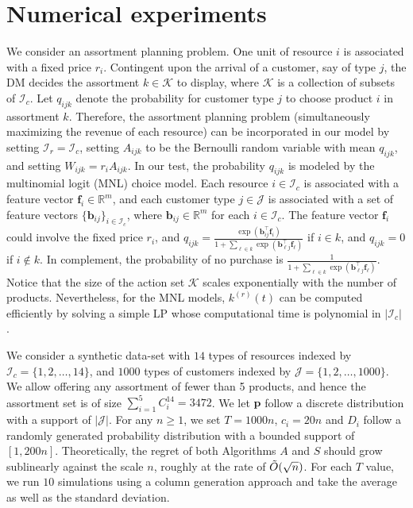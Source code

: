 \documentclass[letterpaper, 10 pt, conference]{ieeeconf}  %
\newcommand{\III}{\mathcal{I}}
\newcommand{\JJJ}{\mathcal{J}}
\newcommand{\KKK}{\mathcal{K}}
\theoremstyle{plain}
\theoremstyle{definition}
\theoremstyle{remark}
\begin{document}
\section{Numerical experiments}\label{sec:num}
We consider an assortment planning problem. One unit of resource $i$ is associated with a fixed price $r_i$. Contingent upon the arrival of a customer, say of type $j$, the DM decides the assortment $k \in \KKK$ to display, where $\KKK$ is a collection of subsets of $\III_c$. Let $q_{ijk}$ denote the probability for customer type $j$ to choose product $i$ in assortment $k$. Therefore, the assortment planning problem (simultaneously maximizing the revenue of each resource) can be incorporated in our model by setting $\III_r = \III_c$, setting $A_{ijk}$ to be the Bernoulli random variable with mean $q_{ijk}$, and setting $W_{ijk}=r_i A_{ijk}$. In our test, the probability $q_{ijk}$ is modeled by the multinomial logit (MNL) choice model. Each resource $i\in \III_c$ is associated with a feature vector $\boldsymbol{f}_i \in \mathbb{R}^m$, and each customer type $j\in \JJJ$ is associated with a set of feature vectors $\{\boldsymbol{b}_{ij} \}_{i \in \III_c}$, where $\boldsymbol{b}_{ij}  \in \mathbb{R}^m$ for each $i\in \III_c$. The feature vector $\boldsymbol{f}_i$ could involve the fixed price $r_i$, and $q_{ijk} = \frac{\exp(\boldsymbol{b}_{ij}^\top \boldsymbol{f}_i)}{1+\sum_{\ell \in k} \exp(\boldsymbol{b}_{\ell j}^\top \boldsymbol{f}_\ell)}$ if $i\in k$, and $q_{ijk} = 0$ if $i\not \in k$. In complement, the probability of no purchase is  $\frac{1}{1+\sum_{\ell \in k} \exp(\boldsymbol{b}_{\ell j}^\top \boldsymbol{f}_\ell)}.$ Notice that the size of the action set $\KKK$ scales exponentially with the number of products. Nevertheless, for the MNL models, $k^{(r)}(t)$ can be computed efficiently by solving a simple LP whose computational time is polynomial in $|\III_c|$ \cite{davis2013assortment}. 

We consider a synthetic data-set with $14$ types of resources indexed by $\III_c=\{1,2,\dots,14\}$, and $1000$ types of customers indexed by $\JJJ=\{1,2,\ldots,1000\}$. We allow offering any assortment of fewer than 5 products, and hence the assortment set is of size $\sum^5_{i=1} C^{14}_i=3472$. We let $\boldsymbol{p}$ follow a discrete distribution with a support of $|\JJJ|$. For any $n \geq 1$, we set $T=1000n$, $c_i=20n$ and $D_i$ follow a randomly generated probability distribution with a bounded support of $[1,200n]$. Theoretically, the regret of both Algorithms $A$ and $S$ should grow sublinearly against the scale $n$, roughly at the rate of $\Tilde{O}(\sqrt{n})$. For each $T$ value, we run $10$ simulations using a column generation approach and take the average as well as the standard deviation.
\end{document}
